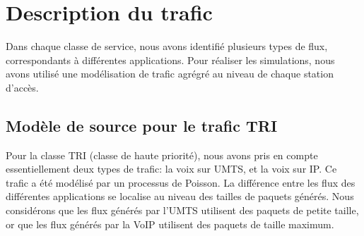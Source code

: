 \section{Description du trafic}
Dans chaque classe de service, nous avons identifi\'e plusieurs types de flux, correspondants \`a diff\'erentes applications. 
Pour r\'ealiser les simulations, nous avons utilis\'e une mod\'elisation de trafic agr\'egr\'e au niveau de chaque station d'acc\`{e}s. 
\subsection{Mod\`ele de source pour le trafic TRI}
Pour la classe TRI (classe de haute priorit\'e), nous avons pris en compte essentiellement deux types de trafic: la voix sur UMTS,  et la voix sur IP.  %
Ce trafic a \'et\'e mod\'elis\'e par un processus de Poisson. %
La diff\'erence entre les flux des diff\'erentes applications se localise au niveau des tailles de paquets g\'en\'er\'es. 
Nous consid\'erons que les flux g\'en\'er\'es par l'UMTS utilisent des paquets de petite taille, or que les flux g\'en\'er\'es par la VoIP utilisent des paquets de taille maximum. 
%
